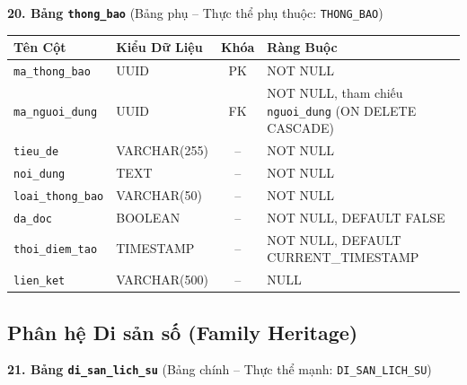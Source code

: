 \noindent\textbf{20. Bảng \texttt{thong\_bao}} \quad (Bảng phụ -- Thực thể phụ thuộc: \texttt{THONG\_BAO})
\vspace{0.2cm}

\begin{center}
\small
\renewcommand{\arraystretch}{1.2}
\begin{tabular}{|p{3.8cm}|p{2.5cm}|c|p{6.5cm}|}
\hline
\textbf{Tên Cột} & \textbf{Kiểu Dữ Liệu} & \textbf{Khóa} & \textbf{Ràng Buộc} \\ \hline
\texttt{ma\_thong\_bao} & UUID & PK & NOT NULL \\ \hline
\texttt{ma\_nguoi\_dung} & UUID & FK & NOT NULL, tham chiếu \texttt{nguoi\_dung} (ON DELETE CASCADE) \\ \hline
\texttt{tieu\_de} & VARCHAR(255) & -- & NOT NULL \\ \hline
\texttt{noi\_dung} & TEXT & -- & NOT NULL \\ \hline
\texttt{loai\_thong\_bao} & VARCHAR(50) & -- & NOT NULL \\ \hline
\texttt{da\_doc} & BOOLEAN & -- & NOT NULL, DEFAULT FALSE \\ \hline
\texttt{thoi\_diem\_tao} & TIMESTAMP & -- & NOT NULL, DEFAULT CURRENT\_TIMESTAMP \\ \hline
\texttt{lien\_ket} & VARCHAR(500) & -- & NULL \\ \hline
\end{tabular}
\end{center}
\vspace{0.3cm}

\subsection{Phân hệ Di sản số (Family Heritage)}
\label{subsec:2_2_4_heritage}

\noindent\textbf{21. Bảng \texttt{di\_san\_lich\_su}} \quad (Bảng chính -- Thực thể mạnh: \texttt{DI\_SAN\_LICH\_SU})
\vspace{0.2cm}

